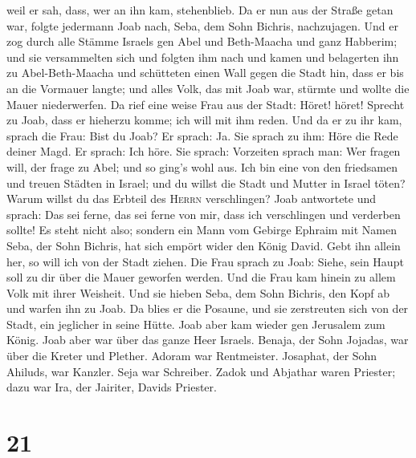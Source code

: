 weil er sah, dass, wer an ihn kam, stehenblieb.  Da er
nun aus der Straße getan war, folgte jedermann Joab nach, Seba, dem Sohn
Bichris, nachzujagen.  Und er zog durch alle Stämme
Israels gen Abel und Beth-Maacha und ganz Habberim; und sie versammelten
sich und folgten ihm nach  und kamen und belagerten ihn
zu Abel-Beth-Maacha und schütteten einen Wall gegen die Stadt hin, dass
er bis an die Vormauer langte; und alles Volk, das mit Joab war, stürmte
und wollte die Mauer niederwerfen.  Da rief eine weise
Frau aus der Stadt: Höret! höret! Sprecht zu Joab, dass er hieherzu
komme; ich will mit ihm reden.  Und da er zu ihr kam,
sprach die Frau: Bist du Joab? Er sprach: Ja. Sie sprach zu ihm: Höre
die Rede deiner Magd. Er sprach: Ich höre.  Sie sprach:
Vorzeiten sprach man: Wer fragen will, der frage zu Abel; und so ging's
wohl aus.  Ich bin eine von den friedsamen und treuen
Städten in Israel; und du willst die Stadt und Mutter in Israel töten?
Warum willst du das Erbteil des \textsc{Herrn} verschlingen?
 Joab antwortete und sprach: Das sei ferne, das sei ferne
von mir, dass ich verschlingen und verderben sollte! Es steht nicht
also;  sondern ein Mann vom Gebirge Ephraim mit Namen
Seba, der Sohn Bichris, hat sich empört wider den König David. Gebt ihn
allein her, so will ich von der Stadt ziehen. Die Frau sprach zu Joab:
Siehe, sein Haupt soll zu dir über die Mauer geworfen werden.
 Und die Frau kam hinein zu allem Volk mit ihrer
Weisheit. Und sie hieben Seba, dem Sohn Bichris, den Kopf ab und warfen
ihn zu Joab. Da blies er die Posaune, und sie zerstreuten sich von der
Stadt, ein jeglicher in seine Hütte. Joab aber kam wieder gen Jerusalem
zum König.  Joab aber war über das ganze Heer Israels.
Benaja, der Sohn Jojadas, war über die Kreter und Plether.
 Adoram war Rentmeister. Josaphat, der Sohn Ahiluds, war
Kanzler.  Seja war Schreiber. Zadok und Abjathar waren
Priester;  dazu war Ira, der Jairiter, Davids Priester.

\hypertarget{section-20}{%
\section{21}\label{section-20}}

